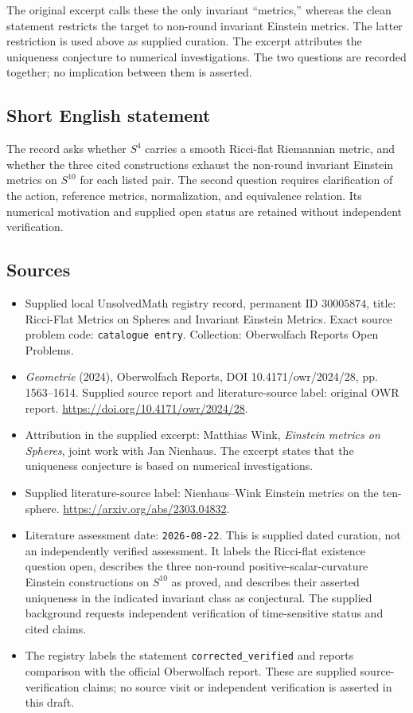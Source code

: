 \documentclass[11pt]{article}
\begin{document}
The original excerpt calls these the only invariant ``metrics,'' whereas the clean statement restricts the target to non-round invariant Einstein metrics. The latter restriction is used above as supplied curation. The excerpt attributes the uniqueness conjecture to numerical investigations. The two questions are recorded together; no implication between them is asserted.
\subsection{Short English statement}
The record asks whether \(S^4\) carries a smooth Ricci-flat Riemannian metric, and whether the three cited constructions exhaust the non-round invariant Einstein metrics on \(S^{10}\) for each listed pair. The second question requires clarification of the action, reference metrics, normalization, and equivalence relation. Its numerical motivation and supplied open status are retained without independent verification.
\subsection{Sources}
\begin{itemize}
\item Supplied local UnsolvedMath registry record, permanent ID \(30005874\), title: Ricci-Flat Metrics on Spheres and Invariant Einstein Metrics. Exact source problem code: \texttt{catalogue entry}. Collection: Oberwolfach Reports Open Problems.
\item \emph{Geometrie} (2024), Oberwolfach Reports, DOI 10.4171/owr/2024/28, pp. 1563--1614. Supplied source report and literature-source label: original OWR report. \url{https://doi.org/10.4171/owr/2024/28}.
\item Attribution in the supplied excerpt: Matthias Wink, \emph{Einstein metrics on Spheres}, joint work with Jan Nienhaus. The excerpt states that the uniqueness conjecture is based on numerical investigations.
\item Supplied literature-source label: Nienhaus--Wink Einstein metrics on the ten-sphere. \url{https://arxiv.org/abs/2303.04832}.
\item Literature assessment date: \texttt{2026-08-22}. This is supplied dated curation, not an independently verified assessment. It labels the Ricci-flat existence question open, describes the three non-round positive-scalar-curvature Einstein constructions on \(S^{10}\) as proved, and describes their asserted uniqueness in the indicated invariant class as conjectural. The supplied background requests independent verification of time-sensitive status and cited claims.
\item The registry labels the statement \texttt{corrected\_verified} and reports comparison with the official Oberwolfach report. These are supplied source-verification claims; no source visit or independent verification is asserted in this draft.
\end{itemize}
\end{document}
